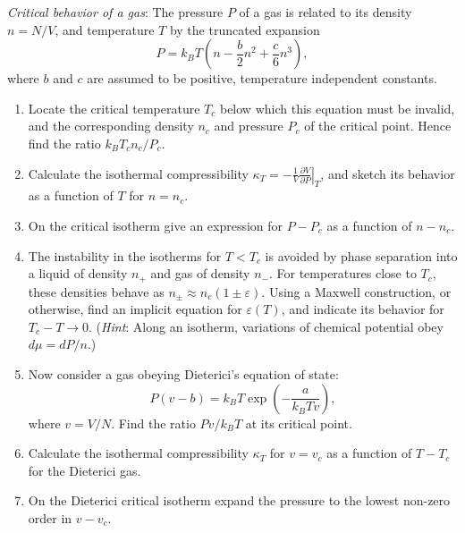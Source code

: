 \begin{problem}
    \textit{Critical behavior of a gas}: The pressure $P$ of a gas is related to its density $n = N/V$, and temperature $T$ by the truncated expansion
    \[
        P = k_BT\!\left(n - \frac{b}{2}n^2 + \frac{c}{6}n^3\right),
    \]
    where $b$ and $c$ are assumed to be positive, temperature independent constants.

    \begin{enumerate}
        \item[(a)] Locate the critical temperature $T_c$ below which this equation must be invalid, and the corresponding density $n_c$ and pressure $P_c$ of the critical point. Hence find the ratio $k_BT_c n_c/P_c$.

        \item[(b)] Calculate the isothermal compressibility $\kappa_T = -\frac{1}{V}\left.\frac{\partial V}{\partial P}\right|_T$, and sketch its behavior as a function of $T$ for $n = n_c$.

        \item[(c)] On the critical isotherm give an expression for $P - P_c$ as a function of $n - n_c$.

        \item[(d)] The instability in the isotherms for $T < T_c$ is avoided by phase separation into a liquid of density $n_+$ and gas of density $n_-$. For temperatures close to $T_c$, these densities behave as $n_\pm \approx n_c(1 \pm \varepsilon)$. Using a Maxwell construction, or otherwise, find an implicit equation for $\varepsilon(T)$, and indicate its behavior for $T_c - T \to 0$. (\textit{Hint}: Along an isotherm, variations of chemical potential obey $d\mu = dP/n$.)

        \item[(e)] Now consider a gas obeying Dieterici's equation of state:
        \[
            P(v - b) = k_BT \exp\!\left(-\frac{a}{k_BT v}\right),
        \]
        where $v = V/N$. Find the ratio $Pv/k_BT$ at its critical point.

        \item[(f)] Calculate the isothermal compressibility $\kappa_T$ for $v = v_c$ as a function of $T - T_c$ for the Dieterici gas.

        \item[(g)] On the Dieterici critical isotherm expand the pressure to the lowest non-zero order in $v - v_c$.
    \end{enumerate}
\end{problem}


